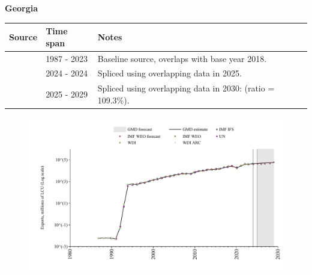 \documentclass[12pt,a4paper,landscape]{article}
\begin{document}
\begin{adjustbox}{max totalsize={\paperwidth}{\paperheight},center}
\begin{minipage}[t][\textheight][t]{\textwidth}
\vspace*{0.5cm}
{}
\begin{center}
{\Large\bfseries Georgia}
\end{center}
\vspace{0.5cm}
\begin{table}[H]
\centering
\small
\begin{tabular}{|l|l|l|}
\hline
\textbf{Source} & \textbf{Time span} & \textbf{Notes} \\
\hline
\rowcolor{white}\cite{WDI}& 1987 - 2023 &Baseline source, overlaps with base year 2018.\\
\rowcolor{lightgray}\cite{IMF_IFS}& 2024 - 2024 &Spliced using overlapping data in 2025.\\
\rowcolor{white}\cite{IMF_WEO_forecast}& 2025 - 2029 &Spliced using overlapping data in 2030: (ratio = 109.3\%).\\
\hline
\end{tabular}
\end{table}
\begin{figure}[H]
\centering
\includegraphics[width=\textwidth,height=0.6\textheight,keepaspectratio]{graphs/GEO_exports.pdf}
\end{figure}
\end{minipage}
\end{adjustbox}
\end{document}
